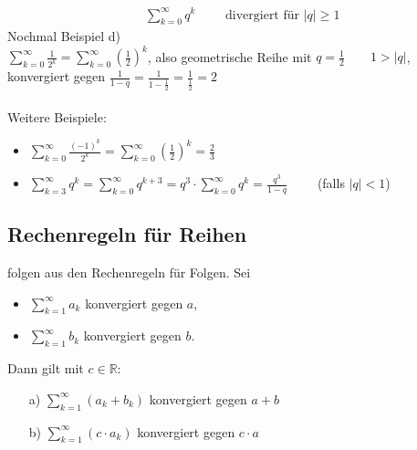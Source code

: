 \documentclass[12pt, titlepage]{article}
\newcommand{\R}{\mathds{R}}
\renewcommand{\>}{\rightarrow}
\renewcommand{\*}{\cdot}
\begin{document}
\begin{itemize}
\begin{align*}
			&\sum_{k=0}^{\infty}q^k\qquad\textrm{ divergiert für }|q|\geq 1
		\end{align*}
		Nochmal Beispiel d)\\
		$\sum_{k=0}^{\infty}\frac{1}{2^k}=\sum_{k=0}^{\infty}(\frac{1}{2})^k$, also geometrische Reihe mit $q=\frac{1}{2}\qquad1>|q|$, konvergiert gegen $\frac{1}{1-q}=\frac{1}{1-\frac{1}{2}}=\frac{1}{\frac{1}{2}}=2$\\
		\\
		Weitere Beispiele:
		\begin{itemize}
			\item $\sum_{k=0}^{\infty}\frac{(-1)^k}{2^k}=\sum_{k=0}^{\infty}(\frac{1}{2})^k=\frac{2}{3}$
			\item $\sum_{k=3}^{\infty}q^k=\sum_{k=0}^{\infty}q^{k+3}=q^3\*\sum_{k=0}^{\infty}q^k=\frac{q^3}{1-q}\qquad$ (falls $|q|<1$)
		\end{itemize}
	\end{itemize}
		\subsection{Rechenregeln für Reihen}
		folgen aus den Rechenregeln für Folgen. Sei
		\begin{itemize}
			\item $\sum_{k=1}^{\infty}a_k$ konvergiert gegen $a$,
			\item $\sum_{k=1}^{\infty}b_k$ konvergiert gegen $b$.
		\end{itemize}
		Dann gilt mit $c\in\R$:
		\begin{itemize}
			\item[a)] $\sum_{k=1}^{\infty}(a_k+b_k)$ konvergiert gegen $a+b$
			\item[b)] $\sum_{k=1}^{\infty}(c\*a_k)$ konvergiert gegen $c\*a$
		\end{itemize}
\end{document}
